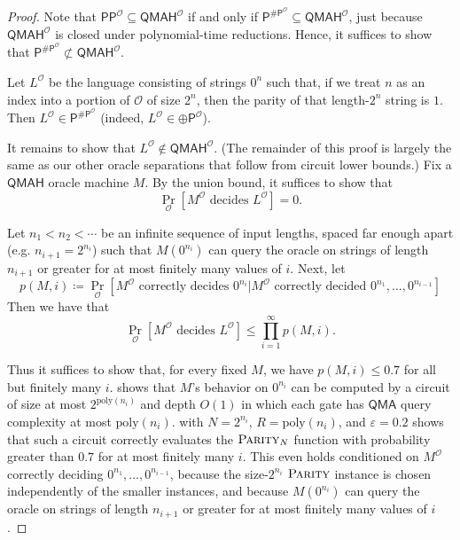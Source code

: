 \documentclass[11pt]{article}%
\newcommand{\eps}{\varepsilon}
\newcommand{\poly}{\mathrm{poly}}
\newcommand{\PARITY}{\normalfont\textsc{Parity}}
\begin{document}
\begin{proof}[Proof]
Note that $\mathsf{PP}^\mathcal{O} \subseteq \mathsf{QMAH}^\mathcal{O}$ if and only if $\mathsf{P}^{\mathsf{\# P}^\mathcal{O}} \subseteq \mathsf{QMAH}^\mathcal{O}$, just because $\mathsf{QMAH}^\mathcal{O}$ is closed under polynomial-time reductions. Hence, it suffices to show that $\mathsf{P}^{\mathsf{\# P}^\mathcal{O}} \not\subset \mathsf{QMAH}^\mathcal{O}$.

Let $L^\mathcal{O}$ be the language consisting of strings $0^n$ such that, if we treat $n$ as an index into a portion of $\mathcal{O}$ of size $2^n$, then the parity of that length-$2^n$ string is $1$. Then $L^\mathcal{O} \in \mathsf{P}^{\mathsf{\# P}^\mathcal{O}}$ (indeed, $L^\mathcal{O} \in \mathsf{\oplus P}^\mathcal{O}$).

It remains to show that $L^\mathcal{O} \not\in \mathsf{QMAH}^\mathcal{O}$. (The remainder of this proof is largely the same as our other oracle separations that follow from circuit lower bounds.) Fix a $\mathsf{QMAH}$ oracle machine $M$. By the union bound, it suffices to show that
\[
\Pr_{\mathcal{O}}\left[M^\mathcal{O} \text{ decides } L^\mathcal{O}\right]=0.
\]

Let $n_1<n_2<\cdots$ be an infinite sequence of input lengths, spaced far enough apart (e.g. $n_{i+1}=2^{n_i}$) such that $M\left(0^{n_i}\right)$ can query the oracle on strings of length $n_{i+1}$ or greater for at most finitely many values of $i$. Next, let
\[
p(M,i)\coloneqq\Pr_{\mathcal{O}}\left[M^\mathcal{O} \text{ correctly decides } 0^{n_i}|M^\mathcal{O} \text{ correctly decided }0^{n_1},\dots,0^{n_{i-1}}\right]
\]
Then we have that
\[
\Pr_{\mathcal{O}}\left[M^\mathcal{O}\text{ decides }L^\mathcal{O}\right]\leq\prod_{i=1}^\infty p(M,i).
\]

\noindent Thus it suffices to show that, for every fixed $M$, we have $p(M,i)\leq 0.7$ for all but finitely many $i$.  shows that $M$'s behavior on $0^{n_i}$ can be computed by a circuit of size at most $2^{\poly(n_i)}$ and depth $O(1)$ in which each gate has $\mathsf{QMA}$ query complexity at most $\poly(n_i)$.  with $N = 2^{n_i}$, $R = \poly(n_i)$, and $\eps = 0.2$ shows that such a circuit correctly evaluates the $\PARITY_N$ function with probability greater than $0.7$ for at most finitely many $i$. This even holds conditioned on $M^\mathcal{O}$ correctly deciding $0^{n_1},\ldots,0^{n_{i-1}}$, because the size-$2^{n_i}$ $\PARITY$ instance is chosen independently of the smaller instances, and because $M\left(0^{n_i}\right)$ can query the oracle on strings of length $n_{i+1}$ or greater for at most finitely many values of $i$.
\end{proof}
\end{document}
